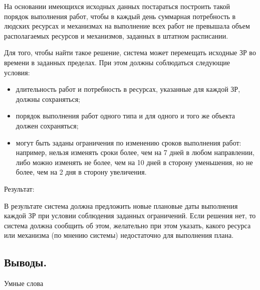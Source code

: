 	На основании имеющихся исходных данных постараться построить такой порядок выполнения работ, чтобы в каждый день суммарная потребность в людских ресурсах и механизмах на выполнение всех работ не превышала объем располагаемых ресурсов и механизмов, заданных в штатном расписании.
	
	Для того, чтобы найти такое решение, система может перемещать исходные ЗР во времени в заданных пределах. При этом должны соблюдаться следующие условия:
	\begin{itemize}
		\item длительность работ и потребность в ресурсах, указанные для каждой ЗР, должны сохраняться;
		\item порядок выполнения работ одного типа и для одного и того же объекта должен сохраняться;
		\item могут быть заданы ограничения по изменению сроков выполнения работ: например, нельзя изменять сроки более, чем на 7 дней в любом направлении, либо можно изменять не более, чем на 10 дней в сторону уменьшения, но не более, чем на 2 дня в сторону увеличения.
	\end{itemize}

	Результат:
	
	В результате система должна предложить новые плановые даты выполнения каждой ЗР при условии соблюдения заданных ограничений. Если решения нет, то система должна сообщить об этом, желательно при этом указать, какого ресурса или механизма (по мнению системы) недостаточно для выполнения плана.
	

\subsection{Выводы.}

Умные слова


\clearpage
